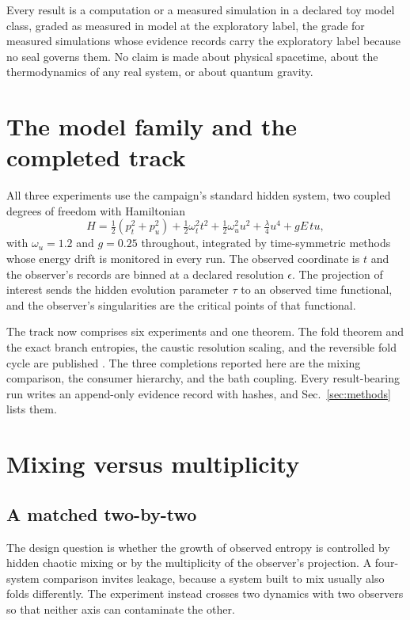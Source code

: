 \documentclass[aps,pre,reprint,nofootinbib]{revtex4-2}
\begin{document}
Every result is a
computation or a measured simulation in a declared toy model class, graded
as measured in model at the exploratory label, the grade for measured
simulations whose evidence records carry the exploratory label because no
seal governs them.  No claim is
made about physical spacetime, about the thermodynamics of any real
system, or about quantum gravity.

\section{The model family and the completed track}
\label{sec:family}

All three experiments use the campaign's standard hidden system, two
coupled degrees of freedom with Hamiltonian
\begin{equation}
H = \tfrac{1}{2}\left(p_t^2 + p_u^2\right)
  + \tfrac{1}{2}\omega_t^2 t^2 + \tfrac{1}{2}\omega_u^2 u^2
  + \tfrac{\lambda}{4} u^4 + gE\,t u,
\label{eq:toy}
\end{equation}
with $\omega_u = 1.2$ and $g = 0.25$ throughout, integrated by
time-symmetric methods whose energy drift is monitored in every run.  The
observed coordinate is $t$ and the observer's records are binned at a
declared resolution $\epsilon$.  The projection of interest sends the
hidden evolution parameter $\tau$ to an observed time functional, and the
observer's singularities are the critical points of that functional.

The track now comprises six experiments and one theorem.  The fold
theorem and the exact
branch entropies, the caustic resolution scaling, and the reversible fold
cycle are published \cite{EntropyPaper}.  The three completions reported
here are the mixing comparison, the consumer hierarchy, and the bath
coupling.  Every result-bearing run writes an append-only evidence record
with hashes, and Sec.~\ref{sec:methods} lists them.

\section{Mixing versus multiplicity}
\label{sec:pe3}

\subsection{A matched two-by-two}

The design question is whether the growth of observed entropy is
controlled by hidden chaotic mixing or by the multiplicity of the
observer's projection.  A four-system comparison invites leakage, because
a system built to mix usually also folds differently.  The experiment
instead crosses two dynamics with two observers so that neither axis can
contaminate the other.
\end{document}
